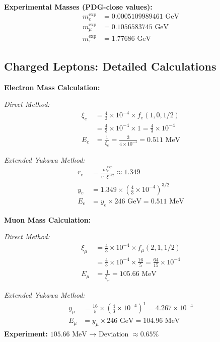 	\textbf{Experimental Masses (PDG-close values):}
	\begin{align}
		m_e^{\text{exp}} &= 0.0005109989461 \text{ GeV} \\
		m_\mu^{\text{exp}} &= 0.1056583745 \text{ GeV} \\
		m_\tau^{\text{exp}} &= 1.77686 \text{ GeV}
	\end{align}
	
	\subsection{Charged Leptons: Detailed Calculations}
	\label{subsec:charged_leptons_detailed}
	
	\textbf{Electron Mass Calculation:}
	
	\textit{Direct Method:}
	\begin{align}
		\xi_e &= \frac{4}{3} \times 10^{-4} \times f_e(1,0,1/2) \\
		&= \frac{4}{3} \times 10^{-4} \times 1 = \frac{4}{3} \times 10^{-4} \\
		E_{e} &= \frac{1}{\xi_e} = \frac{3}{4 \times 10^{-4}} = 0.511 \text{ MeV}
	\end{align}
	
	\textit{Extended Yukawa Method:}
	\begin{align}
		r_e &= \frac{m_e^{\text{exp}}}{v \cdot \xi^{3/2}} \approx 1.349 \\
		y_e &= 1.349 \times \left(\frac{4}{3} \times 10^{-4}\right)^{3/2} \\
		E_e &= y_e \times 246 \text{ GeV} = 0.511 \text{ MeV}
	\end{align}
	
	\textbf{Muon Mass Calculation:}
	
	\textit{Direct Method:}
	\begin{align}
		\xi_\mu &= \frac{4}{3} \times 10^{-4} \times f_\mu(2,1,1/2) \\
		&= \frac{4}{3} \times 10^{-4} \times \frac{16}{5} = \frac{64}{15} \times 10^{-4} \\
		E_{\mu} &= \frac{1}{\xi_\mu} = 105.66 \text{ MeV}
	\end{align}
	
	\textit{Extended Yukawa Method:}
	\begin{align}
		y_\mu &= \frac{16}{5} \times \left(\frac{4}{3} \times 10^{-4}\right)^1 = 4.267 \times 10^{-4} \\
		E_\mu &= y_\mu \times 246 \text{ GeV} = 104.96 \text{ MeV}
	\end{align}
	\textbf{Experiment:} $105.66 \text{ MeV}$ → Deviation $\approx 0.65\%$
	
